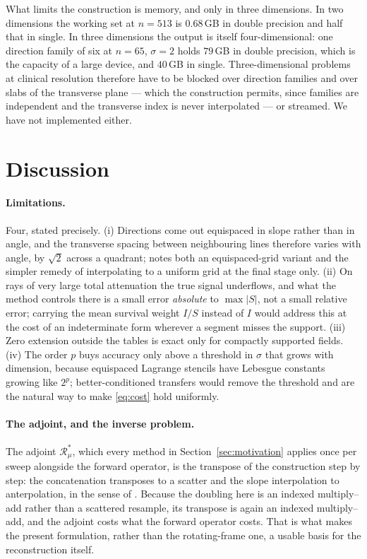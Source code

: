 \documentclass[11pt]{article}
\newcommand{\Rmu}{\mathcal{R}_{\mu}}
\begin{document}
What limits the construction is memory, and only in three dimensions. In two
dimensions the working set at $n=513$ is $0.68$\,GB in double precision and
half that in single. In three dimensions the output is itself
four-dimensional: one direction family of six at $n=65$, $\sigma=2$ holds
$79$\,GB in double precision, which is the capacity of a large device, and
$40$\,GB in single. Three-dimensional problems at clinical resolution
therefore have to be blocked over direction families and over slabs of the
transverse plane --- which the construction permits, since families are
independent and the transverse index is never interpolated --- or streamed. We
have not implemented either.

\section{Discussion}
\label{sec:discussion}

\paragraph{Limitations.}
Four, stated precisely. (i) Directions come out equispaced in slope rather than
in angle, and the transverse spacing between neighbouring lines therefore varies
with angle, by $\sqrt2$ across a quadrant; \citep{brandtdym1999} notes both an
equispaced-grid variant and the simpler remedy of interpolating to a uniform
grid at the final stage only. (ii) On rays of very large total attenuation the
true signal underflows, and what the method controls there is a small error
\emph{absolute} to $\max|S|$, not a small relative error; carrying the mean
survival weight $I/S$ instead of $I$ would address this at the cost of an
indeterminate form wherever a segment misses the support. (iii) Zero extension
outside the tables is exact only for compactly supported fields. (iv) The order
$p$ buys accuracy only above a threshold in $\sigma$ that grows with dimension,
because equispaced Lagrange stencils have Lebesgue constants growing like $2^p$;
better-conditioned transfers would remove the threshold and are the natural way
to make \eqref{eq:cost} hold uniformly.

\paragraph{The adjoint, and the inverse problem.}
The adjoint $\Rmu^{*}$, which every method in Section~\ref{sec:motivation}
applies once per sweep alongside the forward operator, is the transpose of the
construction step by step: the concatenation transposes to a scatter and the
slope interpolation to anterpolation, in the sense of
\citep{brandtlubrecht1990}. Because the doubling here is an indexed
multiply--add rather than a scattered resample, its transpose is again an
indexed multiply--add, and the adjoint costs what the forward operator costs.
That is what makes the present formulation, rather than the rotating-frame one,
a usable basis for the reconstruction itself.
\end{document}
